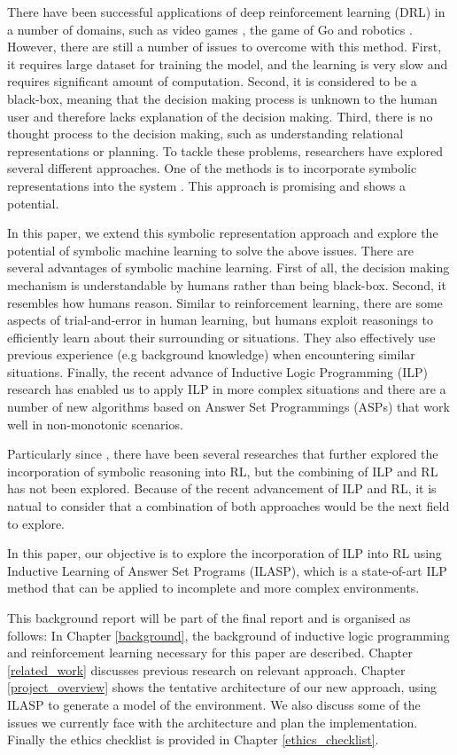 There have been successful applications of deep reinforcement learning (DRL) in a number of domains, such as video games \cite{Mnih2015}, the game of Go \cite{Silver2016} and robotics \cite{Levine2015}. However, there are still a number of issues to overcome with this method.
First, it requires large dataset for training the model, and the learning is very slow and requires significant amount of computation.
Second, it is considered to be a black-box, meaning that the decision making process is unknown to the human user and therefore lacks explanation of the decision making. Third, there is no thought process to the decision making, such as understanding relational representations or planning. To tackle these problems, researchers have explored several different approaches.
One of the methods is to incorporate symbolic representations into the system \cite{Garnelo2016}. This approach is promising and shows a potential.

In this paper, we extend this symbolic representation approach and explore the potential of symbolic machine learning to solve the above issues. There are several advantages of symbolic machine learning. First of all, the decision making mechanism is understandable by humans rather than being black-box.
Second, it resembles how humans reason. Similar to reinforcement learning, there are some aspects of trial-and-error in human learning, but humans exploit reasonings to efficiently learn about their surrounding or situations. They also effectively use previous experience (e.g background knowledge) when encountering similar situations.
Finally, the recent advance of Inductive Logic Programming (ILP) research has enabled us to apply ILP in more complex situations and there are a number of new algorithms based on Answer Set Programmings (ASPs) that work well in non-monotonic scenarios.

Particularly since \cite{Garnelo2016}, there have been several researches that further explored the incorporation of symbolic reasoning into RL, but the combining of ILP and RL has not been explored. Because of the recent advancement of ILP and RL, it is natual to consider that a combination of both approaches would be the next field to explore.

In this paper, our objective is to  explore the incorporation of ILP into RL using Inductive Learning of Answer Set Programs (ILASP), which is a state-of-art ILP method that can be applied to incomplete and more complex environments.

This background report will be part of the final report and is organised as follows: In Chapter \ref{background}, the background of inductive logic programming and reinforcement learning necessary for this paper are described. Chapter \ref{related_work} discusses previous research on relevant approach. Chapter \ref{project_overview} shows the tentative architecture of our new approach, using ILASP to generate a model of the environment. We also discuss some of the issues we currently face with the architecture and plan the implementation. Finally the ethics checklist is provided in Chapter \ref{ethics_checklist}.
